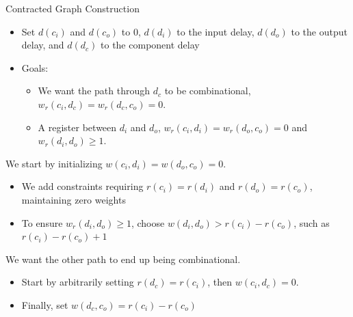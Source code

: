 \begin{frame}[allowframebreaks]{Contracted Graph Construction}
  \begin{itemize}
    \item Set $d(c_i)$ and $d(c_o)$ to 0, $d(d_i)$ to the input delay, $d(d_o)$ to the output delay, and $d(d_c)$ to the component delay
    \item Goals:
    \begin{itemize}
      \item We want the path through $d_c$ to be combinational, $w_r(c_i, d_c) = w_r(d_c, c_o) = 0$.
      \item A register between $d_i$ and $d_o$, $w_r(c_i, d_i)= w_r(d_o, c_o)=0$ and $w_r(d_i, d_o) \geq 1$.
    \end{itemize}
  \end{itemize}

  \framebreak

  We start by initializing $w(c_i, d_i) = w(d_o, c_o) = 0$.

  \begin{itemize}
    \item We add constraints requiring $r(c_i) = r(d_i)$ and $r(d_o) = r(c_o)$, maintaining zero weights
    \item To ensure $w_r(d_i, d_o) \geq 1$, choose $w(d_i, d_o) > r(c_i) - r(c_o)$, such as $r(c_i) - r(c_o) + 1$
  \end{itemize}

  We want the other path to end up being combinational.

  \begin{itemize}
    \item Start by arbitrarily setting $r(d_c) = r(c_i)$, then $w(c_i, d_c) = 0$.
    \item Finally, set $w(d_c, c_o) = r(c_i) - r(c_o)$
  \end{itemize}

  \begin{center}
\end{center}
\end{frame}
